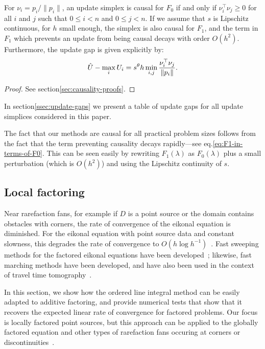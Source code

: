 \documentclass[smallcondensed]{svjour3}
\begin{document}
\begin{theorem}\label{thm:causality}
  For $\nu_i = p_i/\|p_i\|$, an update simplex is causal for $F_0$ if
  and only if $\nu_i^\top \nu_j \geq 0$ for all $i$ and $j$ such that
  $0 \leq i < n$ and $0 \leq j < n$. If we assume that $s$ is
  Lipschitz continuous, for $h$ small enough, the simplex is also
  causal for $F_1$, and the term in $F_1$ which prevents an update
  from being causal decays with order $O(h^2)$. Furthermore, the
  update gap is given explicitly by:
  \begin{equation}
    \hat{U} - \max_i U_i = s^\theta h \min_{i, j} \frac{\nu_i^\top \nu_j}{\left\|p_i\right\|}.
  \end{equation}
\end{theorem}

\begin{proof}
  See section\@ \ref{sec:causality-proofs}.
\end{proof}

In section\@ \ref{ssec:update-gaps} we present a table of update gaps
for all update simplices considered in this paper.

The fact that our methods are causal for all practical problem sizes
follows from the fact that the term preventing causality decays
rapidly---see eq.\@ \ref{eq:F1-in-terms-of-F0}. This can be seen
easily by rewriting $F_1(\lambda)$ as $F_0(\lambda)$ plus a small
perturbation (which is $O(h^2)$) and using the Lipschitz continuity of
$s$.

\subsection{Local factoring}

Near rarefaction fans, for example if $D$ is a point source or the
domain contains obstacles with corners, the rate of convergence of the
eikonal equation is diminished. For the eikonal equation with point
source data and constant slowness, this degrades the rate of
convergence to $O(h \log
h^{-1})$~\cite{qi2018corner,zhao2005fast}. Fast sweeping methods for
the factored eikonal equations have been
developed~\cite{fomel2009fast,luo2012fast}; likewise, fast marching
methods have been developed, and have also been used in the context of
travel time tomography~\cite{qi2018corner,treister2016fast}.

In this section, we show how the ordered line integral method can be
easily adapted to additive factoring, and provide numerical tests that
show that it recovers the expected linear rate of convergence for
factored problems. Our focus is locally factored point sources, but
this approach can be applied to the globally factored equation and
other types of rarefaction fans occuring at corners or
discontinuities~\cite{qi2018corner}.
\end{document}
